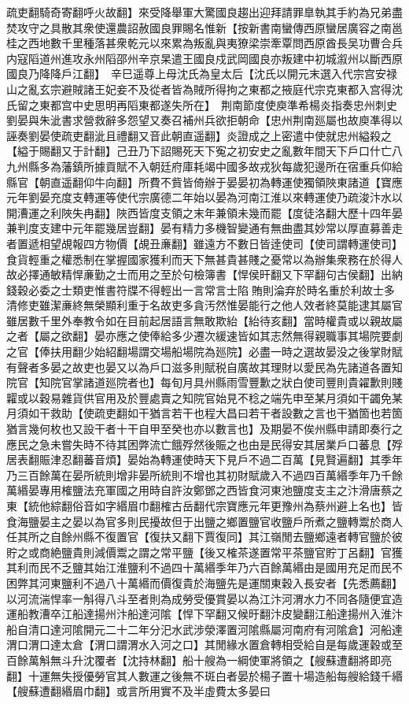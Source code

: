疏吏翻騎奇寄翻呼火故翻】來受降舉軍大驚國良趨出迎拜請罪臯執其手約為兄弟盡焚攻守之具散其衆使還農詔赦國良罪賜名惟新【按新書南蠻傳西原蠻居廣容之南邕桂之西地數千里種落甚衆乾元以來累為叛亂與夷獠梁崇牽覃問西原酋長吴功曹合兵内寇䧟道州進攻永州䧟邵州辛京杲遣王國良戍武岡國良亦叛建中初城溆州以斷西原國良乃降降戶江翻】　辛巳遥尊上母沈氏為皇太后【沈氏以開元末選入代宗宫安禄山之亂玄宗避賊諸王妃妾不及從者皆為賊所得拘之東都之掖庭代宗克東都入宫得沈氏留之東都宫中史思明再䧟東都遂失所在】　荆南節度使庾準希楊炎指奏忠州刺史劉晏與朱泚書求營救辭多怨望又奏召補州兵欲拒朝命【忠州荆南廵屬也故庾凖得以誣奏劉晏使疏吏翻泚且禮翻又音此朝直遥翻】炎證成之上密遣中使就忠州縊殺之【縊于賜翻又于計翻】己丑乃下詔賜死天下寃之初安史之亂數年間天下戶口什亡八九州縣多為藩鎮所據貢賦不入朝廷府庫耗竭中國多故戎狄每歲犯邊所在宿重兵仰給縣官【朝直遥翻仰牛向翻】所費不貲皆倚辦于晏晏初為轉運使獨領陜東諸道【寶應元年劉晏充度支轉運等使代宗廣德二年始以晏為河南江淮以來轉運使乃疏浚汴水以開漕運之利陜失冉翻】陜西皆度支領之末年兼領未幾而罷【度徒洛翻大歷十四年晏兼判度支建中元年罷幾居豈翻】晏有精力多機智變通有無曲盡其妙常以厚直募善走者置遞相望覘報四方物價【覘丑亷翻】雖遠方不數日皆逹使司【使司謂轉運使司】食貨輕重之權悉制在掌握國家獲利而天下無甚貴甚賤之憂常以為辦集衆務在於得人故必擇通敏精悍亷勤之士而用之至於句檢簿書【悍侯旰翻又下罕翻句古侯翻】出納錢穀必委之士類吏惟書符牒不得輕出一言常言士陷賄則淪弃於時名重於利故士多清修吏雖潔亷終無榮顯利重于名故吏多貪汚然惟晏能行之他人效者終莫能逮其屬官雖居數千里外奉教令如在目前起居語言無敢欺紿【紿待亥翻】當時權貴或以親故屬之者【屬之欲翻】晏亦應之使俸給多少遷次緩速皆如其志然無得親職事其場院要劇之官【俸扶用翻少始紹翻場謂交場船場院為廵院】必盡一時之選故晏没之後掌財賦有聲者多晏之故吏也晏又以為戶口滋多則賦税自廣故其理財以愛民為先諸道各置知院官【知院官掌諸道廵院者也】每旬月具州縣雨雪豐歉之狀白使司豐則貴糴歉則賤糶或以穀易雜貨供官用及於豐處賣之知院官始見不稔之端先申至某月須如干蠲免某月須如干救助【使疏吏翻如干猶言若干也程大昌曰若干者設數之言也干猶箇也若箇猶言幾何枚也又設干者十干自甲至癸也亦以數言也】及期晏不俟州縣申請即奏行之應民之急未嘗失時不待其困弊流亡餓殍然後賑之也由是民得安其居業戶口蕃息【殍居表翻賑津忍翻蕃音煩】晏始為轉運使時天下見戶不過二百萬【見賢遍翻】其季年乃三百餘萬在晏所統則增非晏所統則不增也其初財賦歲入不過四百萬緡季年乃千餘萬緡晏專用榷鹽法充軍國之用時自許汝鄭鄧之西皆食河東池鹽度支主之汴滑唐蔡之東【統他綜翻俗音如字緡眉巾翻榷古岳翻代宗寶應元年更豫州為蔡州避上名也】皆食海鹽晏主之晏以為官多則民擾故但于出鹽之鄉置鹽官收鹽戶所煮之鹽轉鬻於商人任其所之自餘州縣不復置官【復扶又翻下賈復同】其江嶺閒去鹽鄉遠者轉官鹽於彼貯之或商絶鹽貴則減價鬻之謂之常平鹽【後又榷茶遂置常平茶鹽官貯丁呂翻】官獲其利而民不乏鹽其始江淮鹽利不過四十萬緡季年乃六百餘萬緡由是國用充足而民不困弊其河東鹽利不過八十萬緡而價復貴於海鹽先是運關東穀入長安者【先悉薦翻】以河流湍悍率一斛得八斗至者則為成勞受優賞晏以為江汴河渭水力不同各隨便宜造運船教漕卒江船達揚州汴船達河隂【悍下罕翻又候旴翻汴皮變翻江船達揚州入淮汴船自清口達河隂開元二十二年分汜水武涉滎澤置河隂縣屬河南府有河隂倉】河船達渭口渭口達太倉【渭口謂渭水入河之口】其閒緣水置倉轉相受給自是每歲運穀或至百餘萬斛無斗升沈覆者【沈持林翻】船十艘為一綱使軍將領之【艘蘇遭翻將即亮翻】十運無失授優勞官其人數運之後無不斑白者晏於楊子置十場造船每艘給錢千緡【艘蘇遭翻緡眉巾翻】或言所用實不及半虛費太多晏曰